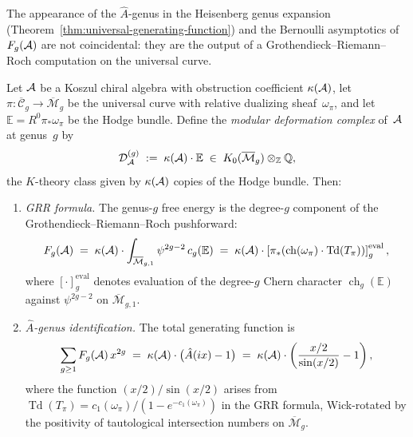 The appearance of the $\hat{A}$-genus in the Heisenberg genus
expansion (Theorem~\ref{thm:universal-generating-function})
and the Bernoulli asymptotics of $F_g(\mathcal{A})$ are not coincidental:
they are the output of a Grothendieck--Riemann--Roch computation
on the universal curve.

\begin{theorem}\label{thm:family-index}
Let $\mathcal{A}$ be a Koszul chiral algebra with obstruction coefficient
$\kappa(\mathcal{A})$, let $\pi \colon \overline{\mathcal{C}}_g \to
\overline{\mathcal{M}}_g$ be the universal curve with relative
dualizing sheaf~$\omega_\pi$, and let
$\mathbb{E} = R^0\pi_*\omega_\pi$ be the Hodge bundle.
Define the \emph{modular deformation complex} of~$\mathcal{A}$ at genus~$g$ by
\begin{equation}\label{eq:modular-deformation-complex-concordance}
\mathcal{D}_{\mathcal{A}}^{(g)}
\;:=\;
\kappa(\mathcal{A}) \cdot \mathbb{E}
\;\in\; K_0(\overline{\mathcal{M}}_g) \otimes_{\mathbb{Z}} \mathbb{Q},
\end{equation}
the $K$-theory class given by $\kappa(\mathcal{A})$ copies of the
Hodge bundle.  Then:
\begin{enumerate}[label=\textup{(\roman*)}]
\item \emph{GRR formula.}
The genus-$g$ free energy is the degree-$g$ component of the
Grothendieck--Riemann--Roch pushforward:
\begin{equation}\label{eq:family-index-grr}
F_g(\mathcal{A})
\;=\;
\kappa(\mathcal{A}) \cdot
\int_{\overline{\mathcal{M}}_{g,1}} \psi^{2g-2}\, c_g(\mathbb{E})
\;=\;
\kappa(\mathcal{A}) \cdot
\left[
  \pi_*\!\left(
    \operatorname{ch}(\omega_\pi) \cdot
    \operatorname{Td}(T_\pi)
  \right)
\right]_g^{\mathrm{eval}},
\end{equation}
where $[\cdot]_g^{\mathrm{eval}}$ denotes evaluation of the degree-$g$ Chern character
$\operatorname{ch}_g(\mathbb{E})$ against $\psi^{2g-2}$ on
$\overline{\mathcal{M}}_{g,1}$.

\item \emph{$\hat{A}$-genus identification.}
The total generating function is
\begin{equation}\label{eq:family-index-generating}
\sum_{g \geq 1} F_g(\mathcal{A})\, x^{2g}
\;=\;
\kappa(\mathcal{A}) \cdot \bigl(\hat{A}(ix) - 1\bigr)
\;=\;
\kappa(\mathcal{A}) \cdot
\left(\frac{x/2}{\sin(x/2)} - 1\right),
\end{equation}
where the function $(x/2)/\sin(x/2)$ arises from
$\operatorname{Td}(T_\pi) = c_1(\omega_\pi)/(1 - e^{-c_1(\omega_\pi)})$
in the GRR formula, Wick-rotated by the positivity of
tautological intersection numbers on
$\overline{\mathcal{M}}_g$.


\end{enumerate}
\end{theorem}

